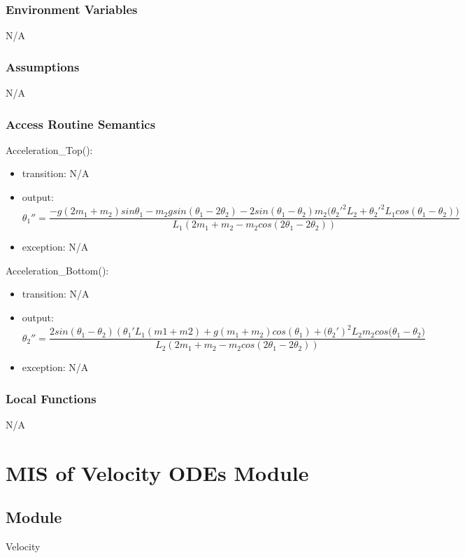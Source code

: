 \documentclass[12pt, titlepage]{article}
\begin{document}
\subsubsection{Environment Variables}
N/A
\subsubsection{Assumptions}
N/A
\subsubsection{Access Routine Semantics}

\noindent Acceleration\_Top():
\begin{itemize}
\item transition: N/A
\item output: \[{\theta_1}''=\frac{-g(2m_1+m_2)sin\theta_1-m_2gsin(\theta_1-2\theta_2)-2sin(\theta_1-\theta_2)m_2({{\theta_2}'}^2L_2+{{\theta_2}'}^2L_1cos(\theta_1-\theta_2)\big)}{L_1(2m_1+m_2-m_2cos(2\theta_1-2\theta_2))}\] 
\item exception: N/A
\end{itemize}

\noindent Acceleration\_Bottom():
\begin{itemize}
\item transition: N/A
\item output: \[{\theta_2}''=\frac{2sin(\theta_1-\theta_2)({\theta_1}'L_1(m1+m2)+g(m_1+m_2)cos(\theta_1)+{(\theta_2}')^2L_2m_2cos(\theta_1-\theta_2\big)}{L_2(2m_1+m_2-m_2cos(2\theta_1-2\theta_2))}\] 
\item exception: N/A
\end{itemize}

\subsubsection{Local Functions}

N/A
\newpage


\section{MIS of Velocity ODEs Module} \label{VOModule} 
 
\subsection{Module}
Velocity 
\end{document}
